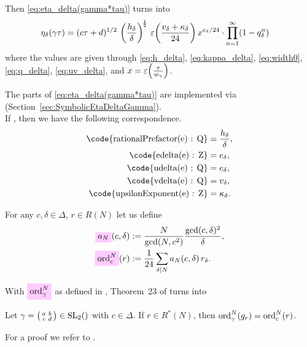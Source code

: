 \documentclass{article}
\begin{document}
Then \eqref{eq:eta_delta(gamma*tau)} turns into
\begin{align}
\eta_\delta(\gamma\tau)
&=
(c \tau+d)^{1/2}
\,
\left(\frac{h_\delta}{\delta}\right)^{\!\frac{1}{2}}
\,
  \varepsilon\!\left(\frac{v_\delta + \kappa_\delta}{24}\right)
  x^{e_\delta/24} \cdot \prod_{n=1}^{\infty}(1-q_\delta^n)
\label{eq:eta_delta(gamma*tau)-expansion}
\end{align}
where the values are given through \eqref{eq:h_delta},
\eqref{eq:kappa_delta}, \eqref{eq:width0}, \eqref{eq:q_delta},
\eqref{eq:uv_delta}, and $x=\varepsilon\!\left(\frac{\tau}{w_\gamma}\right)$.



The parts of \eqref{eq:eta_delta(gamma*tau)} are implemented via
\textcolor{blue}{}
(Section~\ref{sec:SymbolicEtaDeltaGamma}).
\\
If , then we have the following
correspondence.
\begin{align*}
\text{\code{rationalPrefactor(e) : Q}} &= \frac{h_\delta}{\delta},\\
\text{\code{edelta(e) : Z}}            &= e_\delta,\\
\text{\code{udelta(e) : Q}}            &= e_\delta,\\
\text{\code{vdelta(e) : Q}}            &= v_\delta,\\
\text{\code{upsilonExponent(e) : Z}}   &= \kappa_\delta.
\end{align*}

\begin{Definition}
  For any $c, \delta \in\Delta$, $r\in R(N)$ let us define
  \begin{align}
    \defineNotation[a-N]{a_N}(c, \delta)
    &:= \frac{N}{\gcd(N, c^2)} \frac{\gcd(c,\delta)^2}{\delta},
      \notag\\
    \defineNotation[ord-c-N]{\ord_c^N}(r)
    &:= \frac{1}{24}\divisorsum{N} a_N(c, \delta) \, r_\delta.
    \label{eq:order-r}
  \end{align}
\end{Definition}

With $\defineNotation[ord-gamma-N]{\ord_\gamma^N}$ as defined in
\cite{Radu:RamanujanKolberg:2015}, Theorem~23 of
\cite{Radu:RamanujanKolberg:2015} turns into
\begin{Theorem}\label{thm:order}
  Let $\gamma =
  \bigl(
  \begin{smallmatrix}
    a & b\\
    c & d
  \end{smallmatrix}
  \bigr)
  \in \SL2Z$ with $c\in\Delta$.
  If $r \in R^*(N)$, then
  $\operatorname{ord}_\gamma^N(g_r) = \operatorname{ord}_c^N(r)$.
\end{Theorem}
For a proof we refer to
\cite[Proposition~3.2.8]{Ligozat:CourbesModulaires:1975}.
\end{document}
